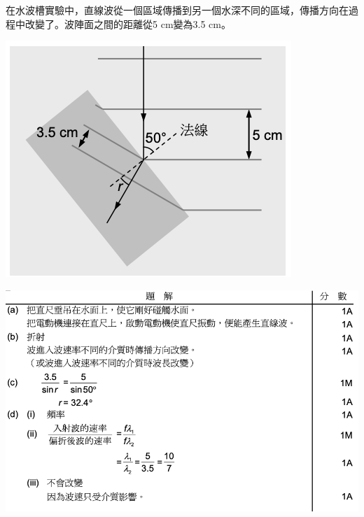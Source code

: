 {
    在水波槽實驗中，直線波從一個區域傳播到另一個水深不同的區域，傳播方向在過程中改變了。波陣面之間的距離從5 cm變為3.5 cm。
    \par{\par\centering\includegraphics[width=.4\textwidth]{./img/ch2_earlyclass_wave_lq_2024-05-13-16-57-30.png}\par}
}{
    \sol\par{\par\centering\includegraphics[width=\textwidth]{./img/ch2_earlyclass_wave_lq_2024-05-13-17-00-19.png}\par}
}

